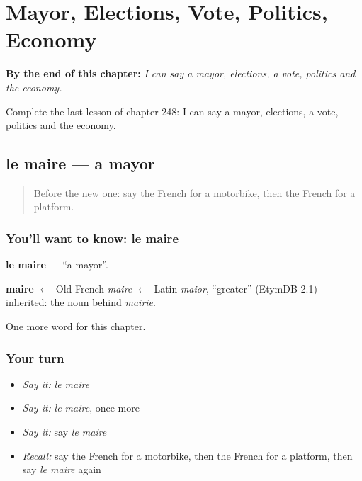 
\chapter{Mayor, Elections, Vote, Politics, Economy}
\label{ch:fr-mayor-elections-vote-politics-economy}

\begin{chapteropening}
\textbf{By the end of this chapter:} \emph{I can say a mayor, elections, a vote, politics and the economy.}

Complete the last lesson of chapter 248: I can say a mayor, elections, a vote, politics and the economy.
\end{chapteropening}

\section[le maire]{le maire — a mayor}

\label{lesson:FR-C248-maire}



\begin{quote}
Before the new one: say the French for a motorbike, then the French for a platform.
\end{quote}

\subsection*{You'll want to know: le maire}
\textbf{le maire} — \textquotedblleft{}a mayor\textquotedblright{}.

\begin{cousinweb}
\textbf{maire} $\leftarrow$ Old French \emph{maire} $\leftarrow$ Latin \emph{maior}, \textquotedblleft{}greater\textquotedblright{} (EtymDB 2.1) — inherited: the noun behind \emph{mairie}.
\end{cousinweb}

\begin{grammarlens}[title={What you've built}]
One more word for this chapter.
\end{grammarlens}

\subsection*{Your turn}
\begin{itemize}
\raggedright
  \item \emph{Say it:} \emph{le maire}
  \item \emph{Say it:} \emph{le maire}, once more
  \item \emph{Say it:} say \emph{le maire}
  \item \emph{Recall:} say the French for a motorbike, then the French for a platform, then say \emph{le maire} again
\end{itemize}


